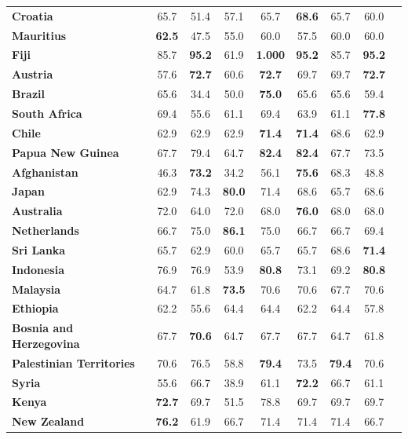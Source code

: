 \begin{table}
{\begin{tabular}{lcccccccc}
\textbf{Croatia} & 65.7 & 51.4 & 57.1 & 65.7 & \textbf{68.6} & 65.7 & 60.0 \\
\textbf{Mauritius} & \textbf{62.5} & 47.5 & 55.0 & 60.0 & 57.5 & 60.0 & 60.0 \\
\textbf{Fiji} & 85.7 & \textbf{95.2} & 61.9 & \textbf{1.000} & \textbf{95.2} & 85.7 & \textbf{95.2} \\
\textbf{Austria} & 57.6 & \textbf{72.7} & 60.6 & \textbf{72.7} & 69.7 & 69.7 & \textbf{72.7} \\
\textbf{Brazil} & 65.6 & 34.4 & 50.0 & \textbf{75.0} & 65.6 & 65.6 & 59.4 \\
\textbf{South Africa} & 69.4 & 55.6 & 61.1 & 69.4 & 63.9 & 61.1 & \textbf{77.8} \\
\textbf{Chile} & 62.9 & 62.9 & 62.9 & \textbf{71.4} & \textbf{71.4} & 68.6 & 62.9 \\
\textbf{Papua New Guinea} & 67.7 & 79.4 & 64.7 & \textbf{82.4} & \textbf{82.4} & 67.7 & 73.5 \\
\textbf{Afghanistan} & 46.3 & \textbf{73.2} & 34.2 & 56.1 & \textbf{75.6} & 68.3 & 48.8 \\
\textbf{Japan} & 62.9 & 74.3 & \textbf{80.0} & 71.4 & 68.6 & 65.7 & 68.6 \\
\textbf{Australia} & 72.0 & 64.0 & 72.0 & 68.0 & \textbf{76.0} & 68.0 & 68.0 \\
\textbf{Netherlands} & 66.7 & 75.0 & \textbf{86.1} & 75.0 & 66.7 & 66.7 & 69.4 \\
\textbf{Sri Lanka} & 65.7 & 62.9 & 60.0 & 65.7 & 65.7 & 68.6 & \textbf{71.4} \\
\textbf{Indonesia} & 76.9 & 76.9 & 53.9 & \textbf{80.8} & 73.1 & 69.2 & \textbf{80.8} \\
\textbf{Malaysia} & 64.7 & 61.8 & \textbf{73.5} & 70.6 & 70.6 & 67.7 & 70.6 \\
\textbf{Ethiopia} & 62.2 & 55.6 & 64.4 & 64.4 & 62.2 & 64.4 & 57.8 \\
\textbf{Bosnia and Herzegovina} & 67.7 & \textbf{70.6} & 64.7 & 67.7 & 67.7 & 64.7 & 61.8 \\
\textbf{Palestinian Territories} & 70.6 & 76.5 & 58.8 & \textbf{79.4} & 73.5 & \textbf{79.4} & 70.6 \\
\textbf{Syria} & 55.6 & 66.7 & 38.9 & 61.1 & \textbf{72.2} & 66.7 & 61.1 \\
\textbf{Kenya} & \textbf{72.7} & 69.7 & 51.5 & 78.8 & 69.7 & 69.7 & 69.7 \\
\textbf{New Zealand} & \textbf{76.2} & 61.9 & 66.7 & 71.4 & 71.4 & 71.4 & 66.7 \\

\end{tabular}}
\end{table}
